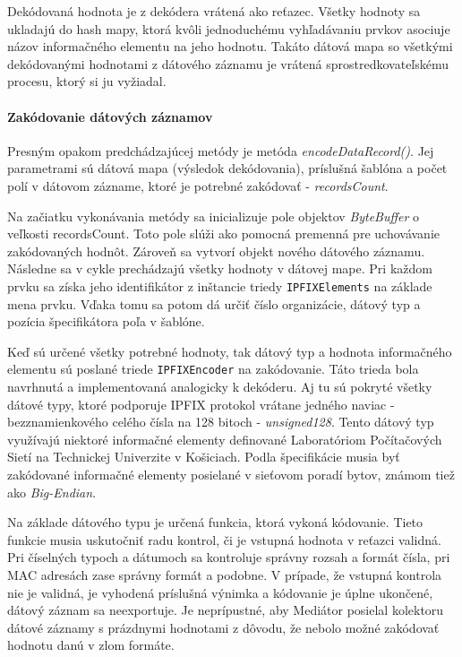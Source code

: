 Dekódovaná hodnota je z dekódera vrátená ako reťazec. Všetky hodnoty sa ukladajú do hash mapy, ktorá 
kvôli jednoduchému vyhľadávaniu prvkov asociuje názov informačného elementu na jeho hodnotu. 
Takáto dátová mapa so všetkými dekódovanými hodnotami z dátového záznamu je vrátená sprostredkovateľskému 
procesu, ktorý si ju vyžiadal.


\paragraph{Zakódovanie dátových záznamov} 
Presným opakom predchádzajúcej metódy je metóda \emph{encodeDataRecord()}. Jej parametrami sú dátová 
mapa (výsledok dekódovania), príslušná šablóna a počet polí v dátovom zázname, ktoré je potrebné 
zakódovať - \emph{recordsCount}.

Na začiatku vykonávania metódy sa inicializuje pole objektov \emph{ByteBuffer} o veľkosti recordsCount.
Toto pole slúži ako pomocná premenná pre uchovávanie zakódovaných hodnôt. Zároveň sa vytvorí objekt 
nového dátového záznamu.
Následne sa v cykle prechádzajú všetky hodnoty v dátovej mape. Pri každom prvku sa získa jeho identifikátor
z inštancie triedy \verb|IPFIXElements| na základe mena prvku. Vďaka tomu sa potom dá určiť číslo
organizácie, dátový typ a pozícia špecifikátora poľa v šablóne. 

Keď sú určené všetky potrebné hodnoty, tak dátový typ a hodnota informačného elementu sú poslané triede 
\verb|IPFIXEncoder| na zakódovanie. Táto trieda bola navrhnutá a implementovaná analogicky k dekóderu. 
Aj tu sú pokryté všetky dátové typy, ktoré podporuje IPFIX protokol vrátane jedného naviac - bezznamienkového
celého čísla na 128 bitoch - \emph{unsigned128}. Tento dátový typ využívajú niektoré informačné elementy 
definované Laboratóriom Počítačových Sietí na Technickej Univerzite v Košiciach. Podla špecifikácie
\citep{rfc5101} musia byť zakódované informačné elementy posielané v sieťovom poradí bytov, známom 
tiež ako \emph{Big-Endian}. 

Na základe dátového typu je určená funkcia, ktorá vykoná kódovanie. 
Tieto funkcie musia uskutočniť radu kontrol, či je vstupná hodnota v reťazci validná. 
Pri číselných typoch a dátumoch sa kontroluje správny rozsah a formát čísla, pri MAC adresách zase 
správny formát a podobne.
V prípade, že vstupná kontrola nie je validná, je vyhodená príslušná výnimka a 
kódovanie je úplne ukončené, dátový záznam sa neexportuje. Je neprípustné, aby Mediátor posielal kolektoru
dátové záznamy s prázdnymi hodnotami z dôvodu, že nebolo možné zakódovať hodnotu danú v zlom formáte.  

